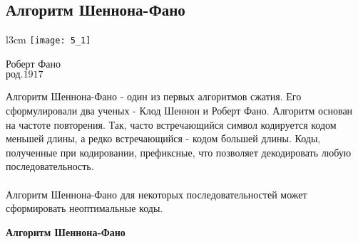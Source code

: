 \subsection{Алгоритм Шеннона-Фано}
\begin{wrapfigure}[13]{l}{3cm}
\texttt{[image: 5\_1]}
\begin{center}
\caption{}
\footnotesize{Роберт Фано}
\\\footnotesize{$\mbox{род.} 1917$}
\end{center}
\end{wrapfigure}
Алгоритм Шеннона-Фано - один из первых алгоритмов сжатия. Его сформулировали два ученых - Клод Шеннон и Роберт Фано. Алгоритм основан на частоте повторения. Так, часто встречающийся символ кодируется кодом меньшей длины, а редко встречающийся - кодом большей длины.
Коды, полученные при кодировании, префиксные, что позволяет декодировать любую последовательность.
\\
\\Алгоритм Шеннона-Фано для некоторых последовательностей может сформировать неоптимальные коды.
\\
\begin{center}
\textbf{Алгоритм Шеннона-Фано}
\end{center}


